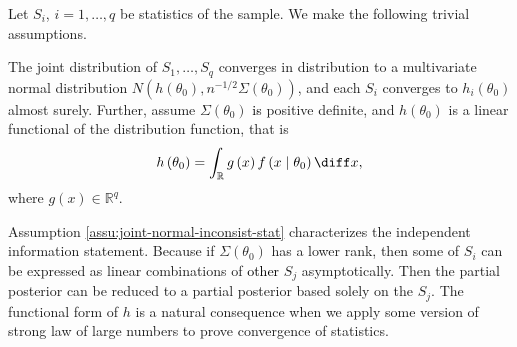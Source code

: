 Let $S_{i}$, $i=1,\ldots,q$ be statistics of the sample. We make
the following trivial assumptions. 
\begin{assumption}
\label{assu:joint-normal-inconsist-stat}The joint distribution of
$S_{1},\ldots,S_{q}$ converges in distribution to a multivariate
normal distribution $N\left(h\left(\theta_{0}\right),n^{-1/2}\Sigma\left(\theta_{0}\right)\right)$,
and each $S_{i}$ converges to $h_{i}\left(\theta_{0}\right)$ almost
surely. Further, assume $\Sigma\left(\theta_{0}\right)$ {{}
}\textcolor{black}{is } positive definite, and $h\left(\theta_{0}\right)$
is a linear functional of the distribution function, that is 
\[
h\left(\theta_{0}\right)=\int_{\mathbb{R}}g\left(x\right)f\left(x\mid\theta_{0}\right)\diff x,
\]
where $g\left(x\right)\in\mathbb{R}^{q}$. 
\end{assumption}
Assumption \ref{assu:joint-normal-inconsist-stat} characterizes the
 independent information statement. Because if $\Sigma\left(\theta_{0}\right)$
has a lower rank, then some of $S_{i}$ can be expressed as \textcolor{black}{
}linear combinations of {{} }\textcolor{black}{other } $S_{j}$
asymptotically. Then the partial posterior can be reduced to a partial
posterior based solely on the $S_{j}$. The functional form of $h$ is
a natural consequence when we apply some version of strong law of
large numbers to prove convergence of statistics. 

